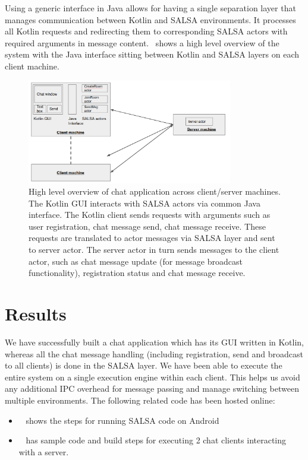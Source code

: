 \documentclass[a4paper]{article}
\begin{document}
Using a generic interface in Java allows for having a single separation layer that manages communication between Kotlin and SALSA environments. It processes all Kotlin requests and redirecting them to corresponding SALSA actors with required arguments in message content.~ shows a high level overview of the system with the Java interface sitting between Kotlin and SALSA layers on each client machine. 

\begin{figure}
\centering
\includegraphics[width=0.8\textwidth]{Client-Server.png}
\caption{\label{fig:clientserver}High level overview of chat application across client/server machines. The Kotlin GUI interacts with SALSA actors via common Java interface. The Kotlin client sends requests with arguments such as user registration, chat message send, chat message receive. These requests are translated to actor messages via SALSA layer and sent to server actor. The server actor in turn sends messages to the client actor, such as chat message update (for message broadcast functionality), registration status and chat message receive.}
\end{figure}


\section{Results}

We have successfully built a chat application which has its GUI written in Kotlin, whereas all the chat message handling (including registration, send and broadcast to all clients) is done in the SALSA layer. We have been able to execute the entire system on a single execution engine within each client. This helps us avoid any additional IPC overhead for message passing and manage switching between multiple environments. The following related code has been hosted online: 
\begin{itemize}
\item ~\cite{salsaandroid} shows the steps for running SALSA code on Android 
\item ~\cite{chatapp} has sample code and build steps for executing 2 chat clients interacting with a server. 
\end{itemize}
\end{document}
